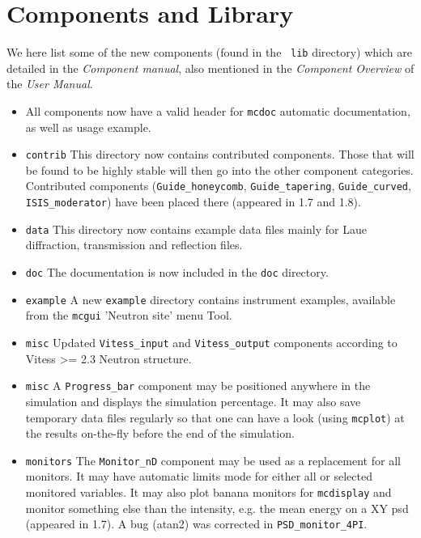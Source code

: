 \section{Components and Library} 
\label{s:new-features:components}
 
  
  We here list some of the new components (found in the \MCS\ \verb+lib+ directory) 
which are detailed in the {\it Component manual}, also mentioned in
the {\it Component Overview} of the {\it User Manual}.
  
\begin{itemize}
\item All components now have a valid header for \texttt{mcdoc} automatic documentation, as well as usage example.
\item \texttt{contrib} This directory now contains contributed
    components. Those that will be found to be highly stable will then
    go into the other component categories. Contributed components
    (\verb+Guide_honeycomb+, \verb+Guide_tapering+,
    \verb+Guide_curved+, \verb+ISIS_moderator+) have been
    placed there (appeared in 1.7 and 1.8). 
\item \texttt{data} This directory now contains example data files mainly for Laue diffraction, transmission and reflection files. 
\item \texttt{doc} The documentation is now included in the \verb+doc+ directory. 
\item \texttt{example} A new \verb+example+ directory contains instrument examples, available from the \verb+mcgui+ 'Neutron site' menu Tool.
\item \texttt{misc} Updated \verb+Vitess_input+ and \verb+Vitess_output+ components according to Vitess >= 2.3 Neutron structure.
\item \texttt{misc} A \verb+Progress_bar+ component may be positioned anywhere in the simulation and displays the simulation percentage. It may also save temporary data files regularly so that one can have a look  (using \verb+mcplot+) at the results on-the-fly before the end of the simulation.
\item \texttt{monitors} The \verb+Monitor_nD+ component may be used as a replacement for all monitors. It may have automatic limits mode for either all or selected monitored variables. It may also plot banana monitors for \verb+mcdisplay+ and monitor something else than the intensity, e.g. the mean energy on a XY psd (appeared in 1.7).  A bug (atan2) was corrected in \verb+PSD_monitor_4PI+. 

\end{itemize}
